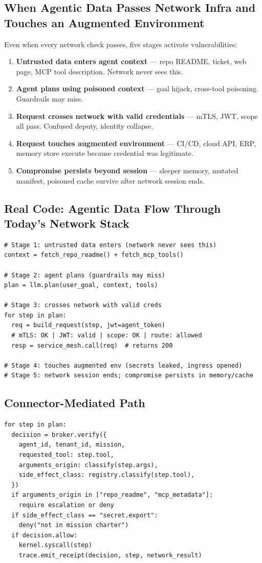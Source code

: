 \documentclass[10pt]{article}
\begin{document}
\subsection{When Agentic Data Passes Network Infra and Touches an Augmented Environment}
Even when every network check passes, five stages activate vulnerabilities:
\begin{enumerate}
  \item \textbf{Untrusted data enters agent context} --- repo README, ticket, web page, MCP tool description. Network never sees this.
  \item \textbf{Agent plans using poisoned context} --- goal hijack, cross-tool poisoning. Guardrails may miss.
  \item \textbf{Request crosses network with valid credentials} --- mTLS, JWT, scope all pass. Confused deputy, identity collapse.
  \item \textbf{Request touches augmented environment} --- CI/CD, cloud API, ERP, memory store execute because credential was legitimate.
  \item \textbf{Compromise persists beyond session} --- sleeper memory, mutated manifest, poisoned cache survive after network session ends.
\end{enumerate}

\subsection{Real Code: Agentic Data Flow Through Today's Network Stack}
\begin{lstlisting}
# Stage 1: untrusted data enters (network never sees this)
context = fetch_repo_readme() + fetch_mcp_tools()

# Stage 2: agent plans (guardrails may miss)
plan = llm.plan(user_goal, context, tools)

# Stage 3: crosses network with valid creds
for step in plan:
  req = build_request(step, jwt=agent_token)
  # mTLS: OK | JWT: valid | scope: OK | route: allowed
  resp = service_mesh.call(req)  # returns 200

# Stage 4: touches augmented env (secrets leaked, ingress opened)
# Stage 5: network session ends; compromise persists in memory/cache
\end{lstlisting}

\subsection{Connector-Mediated Path}
\begin{lstlisting}
for step in plan:
  decision = broker.verify({
    agent_id, tenant_id, mission,
    requested_tool: step.tool,
    arguments_origin: classify(step.args),
    side_effect_class: registry.classify(step.tool),
  })
  if arguments_origin in ["repo_readme", "mcp_metadata"]:
    require escalation or deny
  if side_effect_class == "secret.export":
    deny("not in mission charter")
  if decision.allow:
    kernel.syscall(step)
    trace.emit_receipt(decision, step, network_result)
\end{lstlisting}
\end{document}

